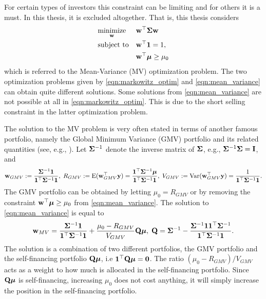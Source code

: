 \documentclass[12pt, oneside]{book}\usepackage{knitr}
\begin{document}
{For certain types of investors this constraint can be limiting and for others it is a must.
In this thesis, it is excluded altogether. 
That is, this thesis considers
\begin{equation}\label{eqn:mean_variance}
\begin{aligned}
& \underset{\mathbf{w}}{\text{minimize}} 
& & \mathbf{w}^\top \mathbf{\Sigma} \mathbf{w} \\
& \text{subject to}
& & \mathbf{w}^\top \mathbf{1} = 1, \\
& && \mathbf{w}^\top \mbox{\boldmath$\mu$} \geq \mu_0 \\
\end{aligned}
\end{equation}
which is referred to the Mean-Variance (MV) optimization problem. 
The two optimization problems given by \eqref{eqn:markowitz_optim} and \eqref{eqn:mean_variance} can obtain quite different solutions. 
Some solutions from \eqref{eqn:mean_variance} are not possible at all in \eqref{eqn:markowitz_optim}.
This is due to the short selling constraint in the latter optimization problem.

The solution to the MV problem is very often stated in terms of another famous portfolio, namely the Global Minimum Variance (GMV) portfolio and its related quantities (see, e.g., \citet{Bodnar2009CaIotEFiEM}). 
Let $\mathbf{\Sigma}^{-1}$ denote the inverse matrix of $\mathbf{\Sigma}$, e.g., $\mathbf{\Sigma}^{-1}\mathbf{\Sigma} = \mathbf{I}$, and
\begin{equation}\label{eqn:GMV}
	\mathbf{w}_{GMV} := \frac{\mathbf{\Sigma}^{-1}\mathbf{1}}{\mathbf{1}^\top \mathbf{\Sigma}^{-1}\mathbf{1}}, \; R_{GMV} :=\operatorname{E}(\mathbf{w}_{GMV}^\top\mathbf{y}) = \frac{\mathbf{1}^\top\mathbf{\Sigma}^{-1}\mbox{\boldmath$\mu$}}{\mathbf{1}^\top \mathbf{\Sigma}^{-1}\mathbf{1}}, \;
	V_{GMV} := \operatorname{Var}(\mathbf{w}_{GMV}^\top\mathbf{y}) =\frac{1}{\mathbf{1}^\top \mathbf{\Sigma}^{-1}\mathbf{1}}.
\end{equation}
The GMV portfolio can be obtained by letting $\mu_0=R_{GMV}$ or by removing the constraint $\mathbf{w}^\top \mbox{\boldmath$\mu$} \geq \mu_0$ from \eqref{eqn:mean_variance}. 
The solution to \eqref{eqn:mean_variance} is equal to
\begin{equation}\label{eqn:mean_var_solution}
	\mathbf{w}_{MV} = \frac{\mathbf{\Sigma}^{-1}\mathbf{1}}{\mathbf{1}^\top \mathbf{\Sigma}^{-1}\mathbf{1}} + \frac{\mu_0 - R_{GMV}}{V_{GMV}} \mathbf{Q} \mbox{\boldmath$\mu$},\; \mathbf{Q} = \mathbf{\Sigma}^{-1} - \frac{\mathbf{\Sigma}^{-1} \mathbf{1} \mathbf{1}^\top \mathbf{\Sigma}^{-1}}{\mathbf{1}^\top \mathbf{\Sigma}^{-1} \mathbf{1}}.
\end{equation}
The solution is a combination of two different portfolios, the GMV portfolio and the self-financing portfolio $\mathbf{Q} \mbox{\boldmath$\mu$}$, i.e $\mathbf{1}^\top \mathbf{Q} \mbox{\boldmath$\mu$} = \mathbf{0}$. 
The ratio $(\mu_0 - R_{GMV})/V_{GMV}$ acts as a weight to how much is allocated in the self-financing portfolio. 
Since $\mathbf{Q} \mbox{\boldmath$\mu$}$ is self-financing, increasing $\mu_0$ does not cost anything, it will simply increase the position in the self-financing portfolio.

}
\end{document}
